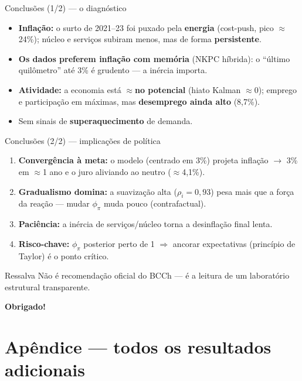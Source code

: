 \documentclass[aspectratio=169,11pt]{beamer}
\begin{document}
\begin{frame}{Conclusões (1/2) --- o diagnóstico}
  \begin{itemize}
    \item \textbf{Inflação:} o surto de 2021--23 foi puxado pela \textbf{energia} (cost-push, pico
          $\approx$24\%); núcleo e serviços subiram menos, mas de forma \textbf{persistente}.
    \item \textbf{Os dados preferem inflação com memória} (NKPC híbrida): o ``último quilômetro'' até
          3\% é grudento --- a inércia importa.
    \item \textbf{Atividade:} a economia está $\approx$\textbf{no potencial} (hiato Kalman $\approx 0$);
          emprego e participação em máximas, mas \textbf{desemprego ainda alto} (8,7\%).
    \item Sem sinais de \textbf{superaquecimento} de demanda.
  \end{itemize}
\end{frame}

\begin{frame}{Conclusões (2/2) --- implicações de política}
  \begin{enumerate}
    \item \textbf{Convergência à meta:} o modelo (centrado em 3\%) projeta inflação $\to$ 3\% em
          $\approx$1 ano e o juro aliviando ao neutro ($\approx$4,1\%).
    \item \textbf{Gradualismo domina:} a suavização alta ($\rho_i=0{,}93$) pesa mais que a força da
          reação --- mudar $\phi_\pi$ muda pouco (contrafactual).
    \item \textbf{Paciência:} a inércia de serviços/núcleo torna a desinflação final lenta.
    \item \textbf{Risco-chave:} $\phi_\pi$ posterior perto de 1 $\Rightarrow$ ancorar expectativas
          (princípio de Taylor) é o ponto crítico.
  \end{enumerate}
  \begin{alertblock}{Ressalva}
    Não é recomendação oficial do BCCh --- é a leitura de um laboratório estrutural transparente.
  \end{alertblock}
\end{frame}

\begin{frame}[plain]
  \centering
  \vfill
  {\Huge\bfseries\color{azul} Obrigado!}
  \vfill
\end{frame}

\appendix
\section{Apêndice --- todos os resultados adicionais}
\end{document}
